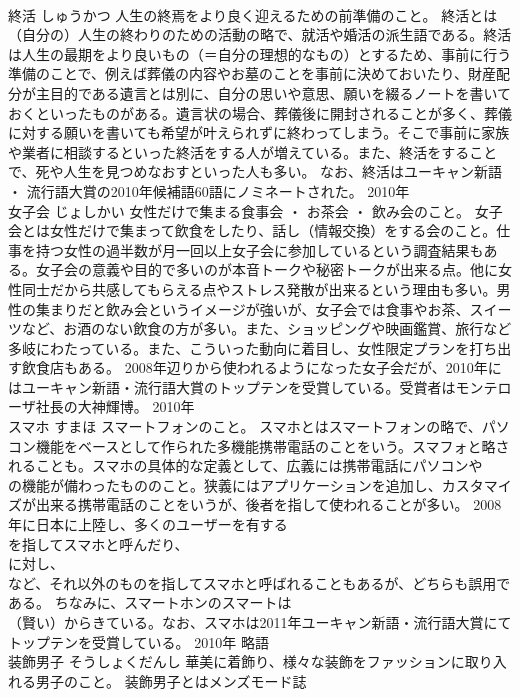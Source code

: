 \documentclass[8pt]{extreport}
\begin{document}
\begin{CJK}{UTF8}{min}
\\	終活	しゅうかつ	人生の終焉をより良く迎えるための前準備のこと。	終活とは（自分の）人生の終わりのための活動の略で、就活や婚活の派生語である。終活は人生の最期をより良いもの（＝自分の理想的なもの）とするため、事前に行う準備のことで、例えば葬儀の内容やお墓のことを事前に決めておいたり、財産配分が主目的である遺言とは別に、自分の思いや意思、願いを綴るノートを書いておくといったものがある。遺言状の場合、葬儀後に開封されることが多く、葬儀に対する願いを書いても希望が叶えられずに終わってしまう。そこで事前に家族や業者に相談するといった終活をする人が増えている。また、終活をすることで、死や人生を見つめなおすといった人も多い。 なお、終活はユーキャン新語 ・ 流行語大賞の2010年候補語60語にノミネートされた。	2010年	
\\	女子会	じょしかい	女性だけで集まる食事会 ・ お茶会 ・ 飲み会のこと。	女子会とは女性だけで集まって飲食をしたり、話し（情報交換）をする会のこと。仕事を持つ女性の過半数が月一回以上女子会に参加しているという調査結果もある。女子会の意義や目的で多いのが本音トークや秘密トークが出来る点。他に女性同士だから共感してもらえる点やストレス発散が出来るという理由も多い。男性の集まりだと飲み会というイメージが強いが、女子会では食事やお茶、スイーツなど、お酒のない飲食の方が多い。また、ショッピングや映画鑑賞、旅行など多岐にわたっている。また、こういった動向に着目し、女性限定プランを打ち出す飲食店もある。 2008年辺りから使われるようになった女子会だが、2010年にはユーキャン新語・流行語大賞のトップテンを受賞している。受賞者はモンテローザ社長の大神輝博。	2010年	
\\	スマホ	すまほ	スマートフォンのこと。	スマホとはスマートフォンの略で、パソコン機能をベースとして作られた多機能携帯電話のことをいう。スマフォと略されることも。スマホの具体的な定義として、広義には携帯電話にパソコンや
\\	の機能が備わったもののこと。狭義にはアプリケーションを追加し、カスタマイズが出来る携帯電話のことをいうが、後者を指して使われることが多い。 2008年に日本に上陸し、多くのユーザーを有する
\\	を指してスマホと呼んだり、
\\	に対し、
\\	など、それ以外のものを指してスマホと呼ばれることもあるが、どちらも誤用である。 ちなみに、スマートホンのスマートは
\\	（賢い）からきている。なお、スマホは2011年ユーキャン新語・流行語大賞にてトップテンを受賞している。	2010年	略語	
\\	装飾男子	そうしょくだんし	華美に着飾り、様々な装飾をファッションに取り入れる男子のこと。	装飾男子とはメンズモード誌

\end{CJK}
\end{document}
